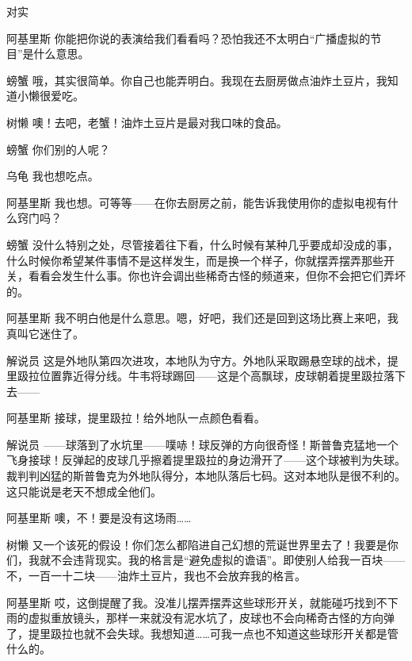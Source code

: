 \begin{dialog}{对实}
\begin{dialogue}
\item[阿基里斯]你能把你说的表演给我们看看吗？恐怕我还不太明白“广播虚拟的节目”是什么意思。

\item[螃蟹]哦，其实很简单。你自己也能弄明白。我现在去厨房做点油炸土豆片，我知道小懒很爱吃。

\item[树懒]噢！去吧，老蟹！油炸土豆片是最对我口味的食品。

\item[螃蟹]你们别的人呢？

\item[乌龟]我也想吃点。

\item[阿基里斯]我也想。可等等——在你去厨房之前，能吿诉我使用你的虚拟电视有什么窍门吗？

\item[螃蟹]没什么特别之处，尽管接着往下看，什么时候有某种几乎要成却没成的事，什么时候你希望某件事情不是这样发生，而是换一个样子，你就摆弄摆弄那些开关，看看会发生什么事。你也许会调出些稀奇古怪的频道来，但你不会把它们弄坏的。


\item[阿基里斯]我不明白他是什么意思。嗯，好吧，我们还是回到这场比赛上来吧，我真叫它迷住了。

\item[解说员]这是外地队第四次进攻，本地队为守方。外地队采取踢悬空球的战术，提里趿拉位置靠近得分线。牛韦将球踢回——这是个高飘球，皮球朝着提里趿拉落下去——

\item[阿基里斯]接球，提里趿拉！给外地队一点颜色看看。

\item[解说员]——球落到了水坑里——噗哧！球反弹的方向很奇怪！斯普鲁克猛地一个飞身接球！反弹起的皮球几乎擦着提里趿拉的身边滑开了——这个球被判为失球。裁判判凶猛的斯普鲁克为外地队得分，本地队落后七码。这对本地队是很不利的。这只能说是老天不想成全他们。

\item[阿基里斯]噢，不！要是没有这场雨……

\item[树懒]又一个该死的假设！你们怎么都陷进自己幻想的荒诞世界里去了！我要是你们，我就不会违背现实。我的格言是“避免虚拟的谵语”。即使别人给我一百块——不，一百一十二块——油炸土豆片，我也不会放弃我的格言。

\item[阿基里斯]哎，这倒提醒了我。没准儿摆弄摆弄这些球形开关，就能碰巧找到不下雨的虚拟重放镜头，那样一来就没有泥水坑了，皮球也不会向稀奇古怪的方向弹了，提里趿拉也就不会失球。我想知道……可我一点也不知道这些球形开关都是管什么的。


\end{dialogue}
\end{dialog}

